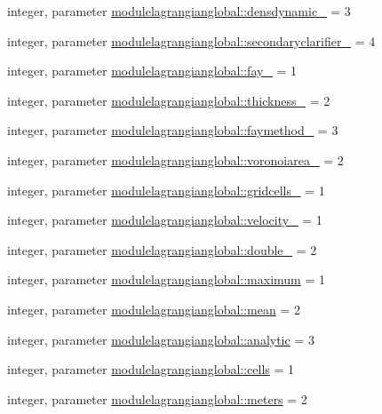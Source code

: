 \begin{DoxyCompactItemize}
\item 
integer, parameter \mbox{\hyperlink{namespacemodulelagrangianglobal_abe64a05fa9af355ff5e3e7e39a9f8064}{modulelagrangianglobal\+::densdynamic\+\_\+}} = 3
\item 
integer, parameter \mbox{\hyperlink{namespacemodulelagrangianglobal_ae7de72ded06a4d5672eda68f51893fe3}{modulelagrangianglobal\+::secondaryclarifier\+\_\+}} = 4
\item 
integer, parameter \mbox{\hyperlink{namespacemodulelagrangianglobal_a6367315ec296b73d63c46a4c9f2dea95}{modulelagrangianglobal\+::fay\+\_\+}} = 1
\item 
integer, parameter \mbox{\hyperlink{namespacemodulelagrangianglobal_a074b9b030351bd4c08790df1e8665391}{modulelagrangianglobal\+::thickness\+\_\+}} = 2
\item 
integer, parameter \mbox{\hyperlink{namespacemodulelagrangianglobal_a55ccaed1b69206d7c4650f3252a9d0f9}{modulelagrangianglobal\+::faymethod\+\_\+}} = 3
\item 
integer, parameter \mbox{\hyperlink{namespacemodulelagrangianglobal_ad16e0f7a15557ac75733a581795ed7ac}{modulelagrangianglobal\+::voronoiarea\+\_\+}} = 2
\item 
integer, parameter \mbox{\hyperlink{namespacemodulelagrangianglobal_ace93ef173b0abecd57fac75827433f43}{modulelagrangianglobal\+::gridcells\+\_\+}} = 1
\item 
integer, parameter \mbox{\hyperlink{namespacemodulelagrangianglobal_ad060a508565823d7304e4127d77e52fd}{modulelagrangianglobal\+::velocity\+\_\+}} = 1
\item 
integer, parameter \mbox{\hyperlink{namespacemodulelagrangianglobal_a1e3eb95b8791b49ea88b9514ec4eb081}{modulelagrangianglobal\+::double\+\_\+}} = 2
\item 
integer, parameter \mbox{\hyperlink{namespacemodulelagrangianglobal_ae42890aff5a3e3e393ac7e4f96d1a73e}{modulelagrangianglobal\+::maximum}} = 1
\item 
integer, parameter \mbox{\hyperlink{namespacemodulelagrangianglobal_a98e7a31f70f9302a914cb9cba0481c47}{modulelagrangianglobal\+::mean}} = 2
\item 
integer, parameter \mbox{\hyperlink{namespacemodulelagrangianglobal_ae13a67c54c4c2a149f2ae49115c6fe94}{modulelagrangianglobal\+::analytic}} = 3
\item 
integer, parameter \mbox{\hyperlink{namespacemodulelagrangianglobal_a883f600b6a938b9cb6645414a7f813c0}{modulelagrangianglobal\+::cells}} = 1
\item 
integer, parameter \mbox{\hyperlink{namespacemodulelagrangianglobal_a05abdbc2950cbbc6d8cfcbeea7f3ae22}{modulelagrangianglobal\+::meters}} = 2

\end{DoxyCompactItemize}
